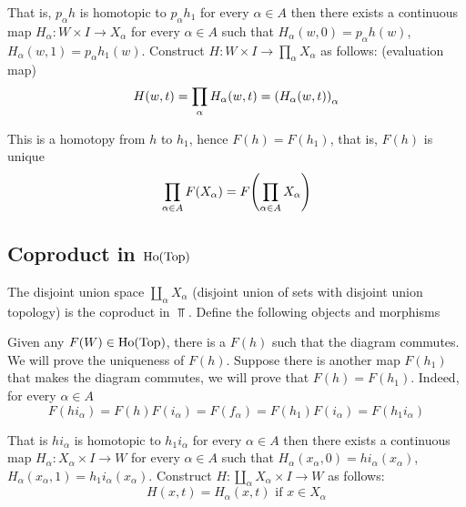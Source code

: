 \documentclass{article}
\begin{document}
That is, $p_\alpha h$ is homotopic to $p_\alpha h_1$ for every $\alpha \in A$ then there exists a continuous map $H_\alpha: W \times I \to X_\alpha$ for every $\alpha \in A$ such that $H_\alpha(w, 0) = p_\alpha h (w)$, $H_\alpha(w, 1) = p_\alpha h_1 (w)$. Construct $H: W \times I \to \prod_\alpha X_\alpha$ as follows: (evaluation map)
$$
    H(w, t) = \prod_\alpha H_\alpha(w, t) = \tuple*{H_\alpha(w, t)}_\alpha
$$

This is a homotopy from $h$ to $h_1$, hence $F(h) = F(h_1)$, that is, $F(h)$ is unique
$$
    \prod_{\alpha \in A} F(X_\alpha) = F \tuple*{\prod_{\alpha \in A} X_\alpha}
$$

\subsection{Coproduct in $\Ho(\Top)$}

The disjoint union space $\coprod_{\alpha} X_\alpha$ (disjoint union of sets with disjoint union topology) is the coproduct in $\Top$. Define the following objects and morphisms

\begin{center}
\end{center}

Given any $F(W) \in \Ho(\Top)$, there is a $F(h)$ such that the diagram commutes. We will prove the uniqueness of $F(h)$. Suppose there is another map $F(h_1)$ that makes the diagram commutes, we will prove that $F(h) = F(h_1)$. Indeed, for every $\alpha \in A$
$$
    F(h i_\alpha) = F(h) F(i_\alpha) = F(f_\alpha) = F(h_1) F(i_\alpha) = F(h_1 i_\alpha)
$$

That is $h i_\alpha$ is homotopic to $h_1 i_\alpha$ for every $\alpha \in A$ then there exists a continuous map $H_\alpha: X_\alpha \times I \to W$ for every $\alpha \in A$ such that $H_\alpha(x_\alpha, 0) = h i_\alpha (x_\alpha)$, $H_\alpha(x_\alpha, 1) = h_1 i_\alpha (x_\alpha)$. Construct $H: \coprod_\alpha X_\alpha \times I \to W$ as follows:
$$
    H(x, t) = H_\alpha(x, t) \text{ if } x \in X_\alpha
$$
\end{document}
